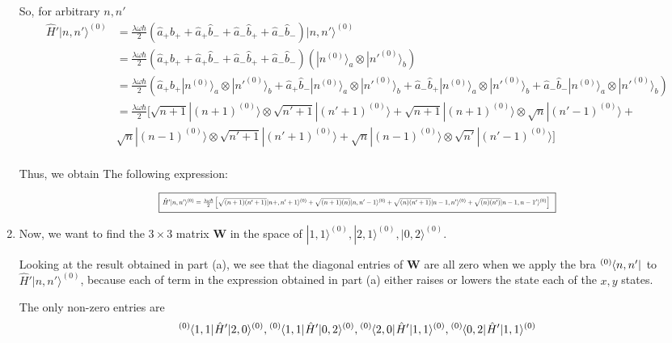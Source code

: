 \documentclass{article}
\newcommand{\ket}[1]{|#1 \rangle}
\newcommand{\bra}[1]{\langle #1|}
\begin{document}
\begin{enumerate}[label=(\alph*)]
  
  So, for arbitrary $n, n'$
  \begin{align*}
    \hat{H}' \ket{n, n'}^{(0)} &= \frac{\lambda \omega \hbar}{2} \left( \hat{a}_{+} \hat{b}_{+} + \hat{a}_{+} \hat{b}_{-} + \hat{a}_{-} \hat{b}_{+} + \hat{a}_{-} \hat{b}_{-} \right) \ket{n, n'}^{(0)} \\
    &= \frac{\lambda \omega \hbar}{2} \left( \hat{a}_{+} \hat{b}_{+} + \hat{a}_{+} \hat{b}_{-} + \hat{a}_{-} \hat{b}_{+} + \hat{a}_{-} \hat{b}_{-} \right) \left( \ket{n^{(0)}}_a \otimes \ket{n'^{(0)}}_b \right) \\
    &= \frac{\lambda \omega \hbar}{2} \left( \hat{a}_{+} \hat{b}_{+} \ket{n^{(0)}}_a \otimes \ket{n'^{(0)}}_b + \hat{a}_{+} \hat{b}_{-} \ket{n^{(0)}}_a \otimes \ket{n'^{(0)}}_b + \hat{a}_{-} \hat{b}_{+} \ket{n^{(0)}}_a \otimes \ket{n'^{(0)}}_b + \hat{a}_{-} \hat{b}_{-} \ket{n^{(0)}}_a \otimes \ket{n'^{(0)}}_b \right)  \\
    &= \frac{\lambda \omega \hbar}{2} [ \sqrt{n+1}\ket{(n+1)^{(0)}} \otimes \sqrt{n'+1}\ket{(n'+1)^{(0)}} + \sqrt{n+1}\ket{(n+1)^{(0)}} \otimes \sqrt{n}\ket{(n'-1)^{(0)}} + \\
    &\sqrt{n}\ket{(n-1)^{(0)}} \otimes \sqrt{n'+1}\ket{(n'+1)^{(0)}} + \sqrt{n}\ket{(n-1)^{(0)}} \otimes \sqrt{n'}\ket{(n'-1)^{(0)}} ] \\
  \end{align*}

  Thus, we obtain The following expression:

  \begin{equation*}
\boxed{    \resizebox{\textwidth}{!}
    {$ \hat{H}' \ket{n, n'}^{(0)} = \frac{\lambda \omega \hbar}{2}  \left[\sqrt{(n+1)(n'+1)}\ket{n+,n'+1}^{(0)} + \sqrt{(n+1)(n)}\ket{n,n'-1}^{(0)} + \sqrt{(n)(n'+1)}\ket{n-1,n'}^{(0)} + \sqrt{(n)(n')}\ket{n-1,n-1'}^{(0)}\right] $
    }}
  \end{equation*}

  \vskip 0.5cm
  \item Now, we want to find the $3 \times 3$ matrix $\mathbf{W}$ in the space of $\ket{1,1}^{(0)}, \ket{2,1}^{(0)}, \ket{0,2}^{(0)}$.
  
  \vskip 0.5cm
  Looking at the result obtained in part (a), we see that the diagonal entries of $\mathbf{W}$ are all zero when we apply the bra $ \tensor[^{(0)}]{\bra{n, n'}}{}$ to $\hat{H}'\ket{n,n'}^{(0)}$, because each of term in the expression obtained in part (a) either raises or lowers the state each of the $x, y$ states.

  \vskip 0.5cm
  The only non-zero entries are 
  \begin{align*}
    \tensor[^{(0)}]{\bra{1,1}}{}\hat{H}'\ket{2,0}^{(0)}, \tensor[^{(0)}]{\bra{1,1}}{}\hat{H}'\ket{0,2}^{(0)}, \tensor[^{(0)}]{\bra{2,0}}{}\hat{H}'\ket{1,1}^{(0)}, \tensor[^{(0)}]{\bra{0,2}}{}\hat{H}'\ket{1,1}^{(0)} 
  \end{align*}
  

\end{enumerate}
\end{document}
